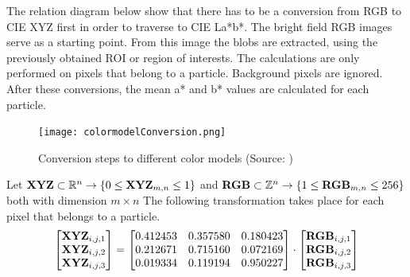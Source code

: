 \documentclass[11pt,fleqn,,a4paper,twoside,openright]{book}
\begin{document}
The relation diagram below show that there has to be a conversion from RGB to CIE XYZ first in order to traverse to CIE La*b*. The bright field RGB images serve as a starting point. From this image the blobs are extracted, using the previously obtained ROI or region of interests. The calculations are only performed on pixels that belong to a particle. Background pixels are ignored. After these conversions, the mean a* and b* values are calculated for each particle.

\begin{figure}[h]
	\centering
	\texttt{[image: colormodelConversion.png]}
	\caption{Conversion steps to different color models (Source: \citeauthor{viscarra_rossel_using_2008} \cite{viscarra_rossel_using_2008})}
	\label{fig:ConversionSteps}
\end{figure}

\begin{sBox}
	Let $\mat{XYZ} \subset \mathbb{R}^n \rightarrow \{0 \leq \mat{XYZ}_{m,n} \leq 1\} $ and $\mat{RGB} \subset \mathbb{Z}^n \rightarrow \{1 \leq \mat{RGB}_{m,n} \leq 256\} $ both with dimension $ m \times n $ The following transformation takes place for each pixel that belongs to a particle.
	\begin{equation}
		\begin{bmatrix}
		\mat{XYZ}_{i,j,1} \\
		\mat{XYZ}_{i,j,2} \\
		\mat{XYZ}_{i,j,3}
		\end{bmatrix}
		= \begin{bmatrix}
		0.412453 & 0.357580 & 0.180423 \\
		0.212671 & 0.715160 & 0.072169 \\
		0.019334 & 0.119194 & 0.950227
		\end{bmatrix}
		\cdot
		\begin{bmatrix}
			\mat{RGB}_{i,j, 1} \\
			\mat{RGB}_{i,j, 2} \\
			\mat{RGB}_{i,j, 3}
		\end{bmatrix}
	\end{equation}
\end{sBox}
\end{document}
